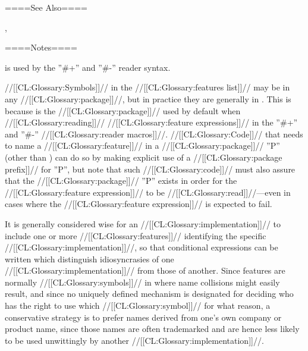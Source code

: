 ====See Also====

{\secref\ReadTimeConditionals}, {\secref\StandardMacroChars}

====Notes====

 is used by the ''#+'' and ''#-'' reader syntax.

//[[CL:Glossary:Symbols]]// in the //[[CL:Glossary:features list]]// may be in any //[[CL:Glossary:package]]//, but in practice they are generally in . This is because  is the //[[CL:Glossary:package]]// used by default when //[[CL:Glossary:reading]]// //[[CL:Glossary:feature expressions]]// in the ''#+'' and ''#-'' //[[CL:Glossary:reader macros]]//. //[[CL:Glossary:Code]]// that needs to name a //[[CL:Glossary:feature]]// in a //[[CL:Glossary:package]]// ''P'' (other than ) can do so by making explicit use of a //[[CL:Glossary:package prefix]]// for ''P'', but note that such //[[CL:Glossary:code]]// must also assure that the //[[CL:Glossary:package]]// ''P'' exists in order for the //[[CL:Glossary:feature expression]]// to be //[[CL:Glossary:read]]//---even in cases where the //[[CL:Glossary:feature expression]]// is expected to fail.

It is generally considered wise for an //[[CL:Glossary:implementation]]// to include one or more //[[CL:Glossary:features]]// identifying the specific //[[CL:Glossary:implementation]]//, so that conditional expressions can be written which distinguish idiosyncrasies of one //[[CL:Glossary:implementation]]// from those of another. Since features are normally //[[CL:Glossary:symbols]]// in  where name collisions might easily result, and since no uniquely defined mechanism is designated for deciding who has the right to use which //[[CL:Glossary:symbol]]// for what reason, a conservative strategy is to prefer names derived from one's own company or product name, since those names are often trademarked and are hence less likely to be used unwittingly by another //[[CL:Glossary:implementation]]//.

  
